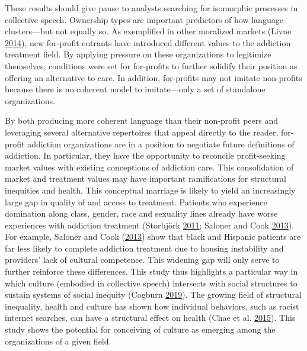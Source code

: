 \documentclass[
  12pt,
]{article}
\begin{document}
\vspace{12pt}

These results should give pause to analysts searching for isomorphic processes in collective speech. Ownership types are important predictors of how language clusters---but not equally so. As exemplified in other moralized markets (Livne \protect\hyperlink{ref-livne2014}{2014}), new for-profit entrants have introduced different values to the addiction treatment field. By applying pressure on these organizations to legitimize themselves, conditions were set for for-profits to further solidify their position as offering an alternative to care. In addition, for-profits may not imitate non-profits because there is no coherent model to imitate---only a set of standalone organizations.

\vspace{12pt}

By both producing more coherent language than their non-profit peers and leveraging several alternative repertoires that appeal directly to the reader, for-profit addiction organizations are in a position to negotiate future definitions of addiction. In particular, they have the opportunity to reconcile profit-seeking market values with existing conceptions of addiction care. This consolidation of market and treatment values may have important ramifications for structural inequities and health. This conceptual marriage is likely to yield an increasingly large gap in quality of and access to treatment. Patients who experience domination along class, gender, race and sexuality lines already have worse experiences with addiction treatment (Storbjörk \protect\hyperlink{ref-storbjork2011}{2011}; Saloner and Cook \protect\hyperlink{ref-saloner2013}{2013}). For example, Saloner and Cook (\protect\hyperlink{ref-saloner2013}{2013}) show that black and Hispanic patients are far less likely to complete addiction treatment due to housing instability and providers' lack of cultural competence. This widening gap will only serve to further reinforce these differences. This study thus highlights a particular way in which culture (embodied in collective speech) intersects with social structures to sustain systems of social inequity (Cogburn \protect\hyperlink{ref-cogburn2019}{2019}). The growing field of structural inequality, health and culture has shown how individual behaviors, such as racist internet searches, can have a structural effect on health (Chae et al. \protect\hyperlink{ref-chae2015}{2015}). This study shows the potential for conceiving of culture as emerging among the organizations of a given field.
\end{document}
